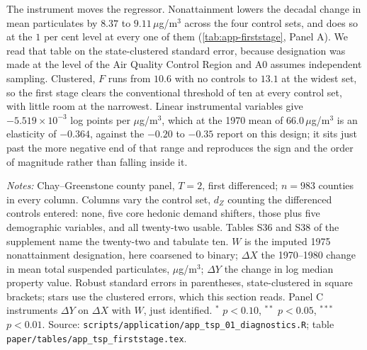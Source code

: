 \documentclass[
  12pt]{article}
\newcommand{\1}[1]{\mathds{1}\left[#1\right]}
\theoremstyle{plain}
\theoremstyle{definition}
\theoremstyle{definition}
\theoremstyle{remark}
\begin{document}
The instrument moves the regressor. Nonattainment lowers the decadal
change in mean particulates by \(8.37\) to \(9.11\,\mu\)g/m\(^3\) across
the four control sets, and does so at the \(1\) per cent level at every
one of them (\cref{tab:app-firststage}, Panel A). We read that table on
the state-clustered standard error, because designation was made at the
level of the Air Quality Control Region and A0 assumes independent
sampling. Clustered, \(F\) runs from \(10.6\) with no controls to
\(13.1\) at the widest set, so the first stage clears the conventional
threshold of ten at every control set, with little room at the
narrowest. Linear instrumental variables give \(-5.519\times10^{-3}\)
log points per \(\mu\)g/m\(^3\), which at the 1970 mean of
\(66.0\,\mu\)g/m\(^3\) is an elasticity of \(-0.364\), against the
\(-0.20\) to \(-0.35\) \citet{chay2005} report on this design; it sits
just past the more negative end of that range and reproduces the sign
and the order of magnitude rather than falling inside it.

%
\begin{table}[!htbp]
\centering
\begin{threeparttable}
\caption{The instrument: first stage, reduced form, and the linear benchmark}
\label{tab:app-firststage}
\footnotesize

\begin{tablenotes}\footnotesize
\item \textit{Notes:} Chay--Greenstone county panel, $T=2$, first differenced;
$n=983$ counties in every column. Columns vary the control set, $d_Z$ counting
the differenced controls entered: none, five core hedonic demand shifters, those
plus five demographic variables, and all twenty-two usable. Tables S36 and S38
of the supplement name the twenty-two and tabulate ten. $W$ is the imputed 1975
nonattainment designation, here coarsened to binary; $\Delta X$ the 1970--1980
change in mean total suspended particulates, $\mu$g/m$^3$; $\Delta Y$ the change
in log median property value. Robust standard errors in parentheses,
state-clustered in square brackets; stars use the clustered errors, which this
section reads. Panel C instruments $\Delta Y$ on $\Delta X$ with $W$, just
identified. $^{*}$ $p<0.10$, $^{**}$ $p<0.05$, $^{***}$ $p<0.01$. Source:
\texttt{scripts/application/app\_tsp\_01\_diagnostics.R}; table
\texttt{paper/tables/app\_tsp\_firststage.tex}.
\end{tablenotes}
\end{threeparttable}
\end{table}
\end{document}
